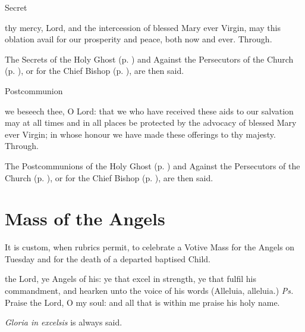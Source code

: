 \begin{inhead}
    Secret
\end{inhead}
 thy mercy, Lord, and the intercession of blessed Mary ever Virgin, may this oblation avail for our prosperity and peace, both now and ever. Through.
\begin{rubric}
    The Secrets of the Holy Ghost (p. \pageref{SPHolyGhost}) and Against the Persecutors of the Church (p. \pageref{SPAgainst}), or for the Chief Bishop (p. \pageref{SPChiefBishop}), are then said.
\end{rubric}
\begin{inhead}
    Postcommunion
\end{inhead}
 we beseech thee, O Lord: that we who have received these aids to our salvation may at all times and in all places be protected by the advocacy of blessed Mary ever Virgin; in whose honour we have made these offerings to thy majesty. Through.
\begin{rubric}
    The Postcommunions of the Holy Ghost (p. \pageref{SPHolyGhost}) and Against the Persecutors of the Church (p. \pageref{SPAgainst}), or for the Chief Bishop (p. \pageref{SPChiefBishop}), are then said.
\end{rubric}
\clearpage

\section{Mass of the Angels}\label{MassOfTheAngels}
\fancyhead[RE,LO]{}
\begin{rubric}
    It is custom, when rubrics permit, to celebrate a Votive Mass for the Angels on Tuesday and for the death of a departed baptised Child.
\end{rubric}
 the Lord, ye Angels of his: ye that excel in strength, ye that fulfil his commandment, and hearken unto the voice of his words (Alleluia, alleluia.) \textit{Ps.} Praise the Lord, O my soul: and all that is within me praise his holy name.

\begin{rubric}
    \emph{Gloria in excelsis} is always said.
\end{rubric}

